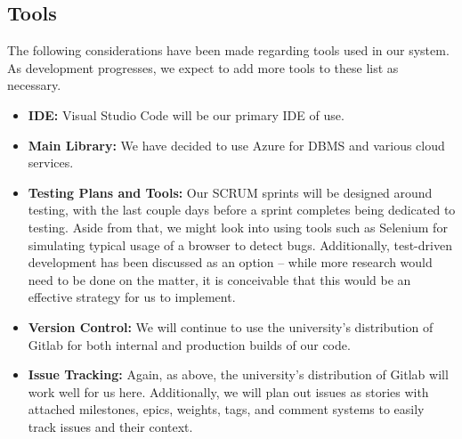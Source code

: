 \subsection{Tools}

The following considerations have been made regarding tools used in our system. As development progresses, we expect to add more tools to these list as necessary.

\medskip

\begin{itemize}[nosep]
    \item \textbf{IDE:} Visual Studio Code will be our primary IDE of use.
    \item \textbf{Main Library:} We have decided to use Azure for DBMS and various cloud services.
    \item \textbf{Testing Plans and Tools:} Our SCRUM sprints will be designed around testing, with the last couple days before a sprint completes being dedicated to testing. Aside from that, we might look into using tools such as Selenium for simulating typical usage of a browser to detect bugs. Additionally, test-driven development has been discussed as an option -- while more research would need to be done on the matter, it is conceivable that this would be an effective strategy for us to implement.
    \item \textbf{Version Control:} We will continue to use the university's distribution of Gitlab for both internal and production builds of our code.
    \item \textbf{Issue Tracking:} Again, as above, the university's distribution of Gitlab will work well for us here. Additionally, we will plan out issues as stories with attached milestones, epics, weights, tags, and comment systems to easily track issues and their context.
\end{itemize}